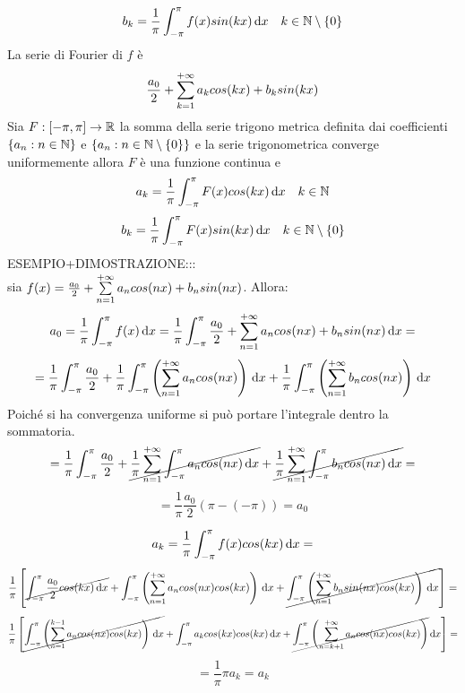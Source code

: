 \[b_k=\frac{1}{\pi}\int_{-\pi}^{\pi}f(x)sin(kx)\,\mathrm{d}{x}\quad k\in\mathbb{N}\setminus{\left\{0\right\}}\]
La serie di Fourier di $f$ è
\[\frac{a_0}{2}+\sum\limits_{k=1}^{+\infty}a_{k}cos(kx)+b_{k}sin(kx)\]
\proposition
Sia $F: \left[-\pi,\pi\right] \to \mathbb{R}$ la somma della serie trigono metrica definita dai coefficienti $\left\{a_n:n\in\mathbb{N}\right\}$ e $\left\{a_n:n\in\mathbb{N}\setminus\left\{0\right\}\right\}$ e la serie trigonometrica converge uniformemente allora $F$ è una funzione continua e
\[a_k=\frac{1}{\pi}\int_{-\pi}^{\pi}F(x)cos(kx)\,\mathrm{d}{x}\quad k\in\mathbb{N}\]
\[b_k=\frac{1}{\pi}\int_{-\pi}^{\pi}F(x)sin(kx)\,\mathrm{d}{x}\quad k\in\mathbb{N}\setminus{\left\{0\right\}}\]
ESEMPIO+DIMOSTRAZIONE:::\\
sia $f(x)=\frac{a_0}{2}+\sum\limits_{n=1}^{+\infty}a_{n}cos(nx)+b_{n}sin(nx)$. Allora:\\
\[a_0=\frac{1}{\pi}\int_{-\pi}^{\pi}f(x)\,\mathrm{d}{x}=\frac{1}{\pi}\int_{-\pi}^{\pi}\frac{a_0}{2}+\sum\limits_{n=1}^{+\infty}a_{n}cos(nx)+b_{n}sin(nx)\,\mathrm{d}{x}=\]
\[
= \frac{1}{\pi}\int_{-\pi}^{\pi}\frac{a_0}{2} +
\frac{1}{\pi}\int_{-\pi}^{\pi}\left(\sum\limits_{n=1}^{+\infty} a_ncos(nx)\right)\,\mathrm{d}{x} +
\frac{1}{\pi}\int_{-\pi}^{\pi}\left(\sum\limits_{n=1}^{+\infty} b_ncos(nx)\right)\,\mathrm{d}{x}
\]
Poiché si ha convergenza uniforme si può portare l'integrale dentro la sommatoria.
\[
= \frac{1}{\pi}\int_{-\pi}^{\pi}\frac{a_0}{2} +
\cancel{\frac{1}{\pi}\sum\limits_{n=1}^{+\infty}\int_{-\pi}^{\pi} a_ncos(nx)\,\mathrm{d}{x}} +
\cancel{\frac{1}{\pi}\sum\limits_{n=1}^{+\infty}\int_{-\pi}^{\pi} b_ncos(nx)\,\mathrm{d}{x}}=
\]
\[=\frac{1}{\pi}\frac{a_0}{2}\left(\pi-(-\pi)\right)=a_0\]


\[a_k=\frac{1}{\pi}\int_{-\pi}^{\pi}f(x)cos(kx)\,\mathrm{d}{x}=\]
\[\frac{1}{\pi}\left[
\cancel{\int_{-\pi}^{\pi}\frac{a_0}{2}cos(kx)\,\mathrm{d}{x}}+
\int_{-\pi}^{\pi}\left(\sum\limits_{n=1}^{+\infty}a_ncos(nx)cos(kx)\right)\,\mathrm{d}{x}+
\cancel{\int_{-\pi}^{\pi}\left(\sum\limits_{n=1}^{+\infty}b_nsin(nx)cos(kx)\right)\,\mathrm{d}{x}}
\right]=\]
\[\frac{1}{\pi}\left[
\cancel{\int_{-\pi}^{\pi}\left(\sum\limits_{n=1}^{k-1} a_ncos(nx)cos(kx)\right)\,\mathrm{d}{x}}+
\int_{-\pi}^{\pi}a_kcos(kx)cos(kx)\,\mathrm{d}{x}+
\cancel{\int_{-\pi}^{\pi}\left(\sum\limits_{n=k+1}^{+\infty}a_ncos(nx)cos(kx)\right)}\,\mathrm{d}{x}
\right]=\]
\[=\frac{1}{\pi}\pi a_k=a_k\]

